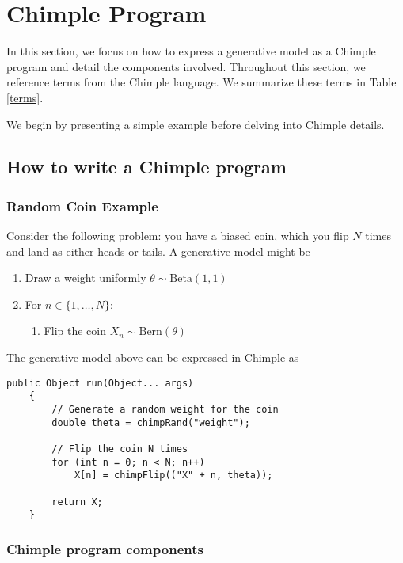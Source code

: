 \chapter{Chimple Program}

In this section, we focus on how to express a generative model as a Chimple
    program and detail the components involved.
Throughout this section, we reference terms from the Chimple language.
We summarize these terms in Table \ref{terms}.

We begin by presenting a simple example before delving into Chimple details.

\section{How to write a Chimple program}

\subsection{Random Coin Example}

Consider the following problem:
you have a biased coin, which you flip $N$ times and land as either heads or tails.
A generative model might be
\begin{enumerate}
   \item Draw a weight uniformly $\theta \sim \text{Beta}(1,1)$
   \item For $n \in \{1, \ldots, N\}$:
    \begin{enumerate}
        \item Flip the coin $X_n \sim \text{Bern}(\theta)$
    \end{enumerate}
\end{enumerate}
The generative model above can be expressed in Chimple as

\begin{center}
\begin{lstlisting}[style=customc]
    public Object run(Object... args)
    {
        // Generate a random weight for the coin
        double theta = chimpRand("weight");

        // Flip the coin N times
        for (int n = 0; n < N; n++)
            X[n] = chimpFlip(("X" + n, theta));

        return X;
    }
\end{lstlisting}
\end{center}

\label{priorsolver}
\subsection{Chimple program components}


